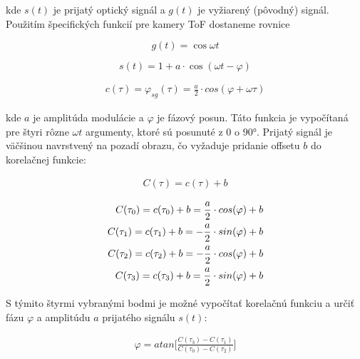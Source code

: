 \begin{flushleft}
kde $s(t)$ je prijatý optický signál a $g(t)$ je vyžiarený (pôvodný) signál. Použitím špecifických funkcií pre kamery ToF dostaneme rovnice

\begin{equation}
\label{eq::tof::02}
g(t) = \cos{\omega t}
\end{equation}

\begin{equation}
\label{eq::tof::03}
s(t) = 1+a\cdot \cos{(\omega t - \varphi)}
\end{equation}

\begin{equation}
\label{eq::tof::04}
\begin{aligned}
c(\tau) = \varphi_{sg}(\tau) =  {{\frac{a}{2}} \cdot cos(\varphi + \omega \tau)}
\end{aligned}
\end{equation}

kde $a$ je amplitúda modulácie a $\varphi$ je fázový posun.
Táto funkcia je vypočítaná pre štyri rôzne $\omega t$ argumenty, ktoré sú posunuté z 0 o $\ang{90}$.
Prijatý signál je väčšinou navrstvený na pozadí obrazu, čo vyžaduje pridanie offsetu $ b $ do korelačnej funkcie:

\begin{equation}
\label{eq::tof::05}
\begin{aligned}
C(\tau) = c(\tau) + b
\end{aligned}
\end{equation}

\begin{equation}
\label{eq::tof::06}
\begin{aligned}
C(\tau _0) = c(\tau _0) + b}=  {{\frac{a}{2}} \cdot cos(\varphi) +b \\
C(\tau _1) = c(\tau _1) + b}= - {{\frac{a}{2}} \cdot sin(\varphi) +b \\
C(\tau _2) = c(\tau _2) + b}=- {{\frac{a}{2}} \cdot cos(\varphi) +b \\
C(\tau _3) = c(\tau _3) + b}= {{\frac{a}{2}} \cdot sin(\varphi) +b 
\end{aligned}
\end{equation}

S týmito štyrmi vybranými bodmi je možné vypočítať korelačnú funkciu a určiť fázu $\varphi$ a amplitúdu $a$ prijatého signálu $s(t)$:

\begin{equation}
\label{eq::tof::07}
\begin{aligned}
\varphi = atan \Bigg[ {\frac{C(\tau _3) - C(\tau _1)}{C(\tau _0) - C(\tau _2)}} \Bigg]
\end{aligned}
\end{equation}


\end{flushleft}
